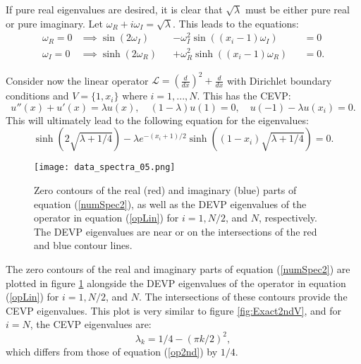 \documentclass{sfuthesis}
\begin{document}
If pure real eigenvalues are desired, it is clear that $\sqrt{\lambda}$ must be either pure real or pure imaginary.
Let $\omega_R + i \omega_I = \sqrt{\lambda}$.
This leads to the equations:
\begin{equation}
\begin{aligned}
\omega_R = 0 & \implies \sin(2 \omega_I) && - \omega_I^2 \sin( (x_i - 1) \omega_I ) && = 0 \\
\omega_I = 0 & \implies \sinh(2 \omega_R) && + \omega_R^2 \sinh( (x_i - 1) \omega_R) && = 0 .
\end{aligned}
\end{equation}


Consider now the linear operator $\mathcal{L} = (\frac{d}{dx})^2 + \frac{d}{dx}$ with Dirichlet boundary conditions and $V = \{1, x_i\}$ where $i = 1,...,N$.
This has the CEVP:
\begin{equation} \label{opLin}
u''(x) + u'(x) = \lambda u(x), \quad (1 - \lambda) u(1) = 0, \quad u(-1) - \lambda u(x_i) = 0.
\end{equation}
This will ultimately lead to the following equation for the eigenvalues:
\begin{equation} \label{numSpec2}
\sinh \left ( 2 \sqrt{\lambda + 1/4} \right ) - \lambda e^{-(x_i+1)/2} \sinh \left ( (1 - x_i) \sqrt{\lambda + 1/4} \right ) = 0 .
\end{equation}

\begin{figure}
\texttt{[image: data\_spectra\_05.png]}
\caption{Zero contours of the real (red) and imaginary (blue) parts of equation (\ref{numSpec2}), as well as the DEVP eigenvalues of the operator in equation (\ref{opLin})
for $i = 1, N/2$, and $N$, respectively.
The DEVP eigenvalues are near or on the intersections of the red and blue contour lines.}
\label{fig:Exact2ndOp}
\end{figure}

The zero contours of the real and imaginary parts of equation (\ref{numSpec2}) are plotted in figure \ref{fig:Exact2ndOp} alongside the DEVP eigenvalues of the operator in equation (\ref{opLin})
for $i = 1, N/2$, and $N$.
The intersections of these contours provide the CEVP eigenvalues.
This plot is very similar to figure \ref{fig:Exact2ndV}, and for $i = N$, the CEVP eigenvalues are:
\begin{equation}
\lambda_k = 1/4 - (\pi k/2)^2,
\end{equation}
which differs from those of equation (\ref{op2nd}) by $1/4$.
\end{document}
